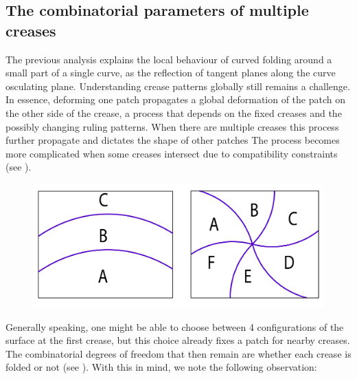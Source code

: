 

\subsection{The combinatorial parameters of multiple creases}
The previous analysis explains the local behaviour of curved folding around a small part of a single curve, as the reflection of tangent planes along the curve osculating plane. Understanding crease patterns globally still remains a challenge. In essence, deforming one patch propagates a global deformation of the patch on the other side of the crease, a process that depends on the fixed creases and the possibly changing ruling patterns. When there are multiple creases this process further propagate and dictates the shape of other patches The process becomes more complicated when some creases intersect due to compatibility constraints (see ). 

\begin{figure} [h]
	\centering
	\includegraphics[width=0.7\linewidth]{figures/multiple_crease_patterns}
	\caption{}
	\label{fig:multiple_crease_patterns}
\end{figure}

Generally speaking, one might be able to choose between 4 configurations of the surface at the first crease, but this choice already fixes a patch for nearby creases. The combinatorial degrees of freedom that then remain are whether each crease is folded or not (see  ). With this in mind, we note the following observation:

